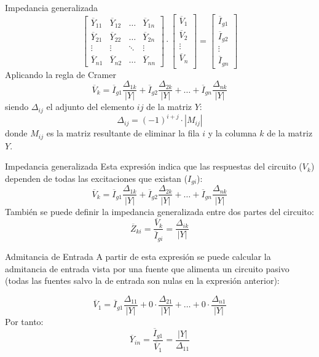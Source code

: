 \documentclass[aspectratio=169, usenames,svgnames,dvipsnames]{beamer}
\begin{document}
\begin{frame}[label={sec:orgece5ee8}]{Impedancia generalizada}
\begin{equation*}
  \begin{bmatrix}
    \overline{Y}_{11} & \overline{Y}_{12} & \dots & \overline{Y}_{1n} \\
    \overline{Y}_{21} & \overline{Y}_{22} & \dots & \overline{Y}_{2n} \\
    \vdots & \vdots & \ddots & \vdots \\
    \overline{Y}_{n1} & \overline{Y}_{n2} &  \dots & \overline{Y}_{nn}
  \end{bmatrix} \cdot %
  \begin{bmatrix}
    \overline{V}_1\\
    \overline{V}_2\\
    \vdots \\
    \overline{V}_n\\
  \end{bmatrix} = %
  \begin{bmatrix}
    \overline{I}_{g1}\\
    \overline{I}_{g2}\\
    \vdots \\
    \overline{I}_{gn}
  \end{bmatrix}
\end{equation*}
Aplicando la regla de Cramer
\[
  \overline{V}_k = \overline{I}_{g1} \frac{\Delta_{1k}}{|Y|} + \overline{I}_{g2} \frac{\Delta_{2k}}{|Y|} + \dots + \overline{I}_{gn} \frac{\Delta_{nk}}{|Y|}
\]
siendo \(\Delta_{ij}\) el adjunto del elemento \(ij\) de la matriz \(Y\):
\[
  \Delta_{ij} = (-1)^{i+j} \cdot |M_{ij}|
\]
donde \(M_{ij}\) es la matriz resultante de eliminar la fila \(i\) y la columna \(k\) de la matriz \(Y\).
\end{frame}

\begin{frame}[label={sec:org9b329a6}]{Impedancia generalizada}
Esta expresión indica que las respuestas del circuito (\(V_k\)) dependen de todas las excitaciones que existan (\(I_{gi}\)):
\[
  \overline{V}_k = \overline{I}_{g1} \frac{\Delta_{1k}}{|Y|} + \overline{I}_{g2} \frac{\Delta_{2k}}{|Y|} + \dots + \overline{I}_{gn} \frac{\Delta_{nk}}{|Y|}
\]
También se puede definir la impedancia generalizada entre dos partes del circuito:
\[
  \overline{Z}_{ki} = \frac{\overline{V}_k}{\overline{I}_{gi}} = \frac{\Delta_{ik}}{|Y|}
\]
\end{frame}

\begin{frame}[label={sec:org191a2f4}]{Admitancia de Entrada}
A partir de esta expresión se puede calcular la admitancia de entrada vista por una fuente que alimenta un circuito pasivo (todas las fuentes salvo la de entrada son nulas en la expresión anterior):

\[
  \overline{V}_1 = \overline{I}_{g1} \frac{\Delta_{11}}{|Y|} + 0 \cdot \frac{\Delta_{21}}{|Y|} + \dots + 0 \cdot \frac{\Delta_{n1}}{|Y|}
\]
Por tanto:
\[
  \boxed{\overline{Y}_{in} = \frac{\overline{I}_{g1}}{\overline{V}_1}=  \frac{|Y|}{\Delta_{11}}}
\]
\end{frame}
\end{document}
